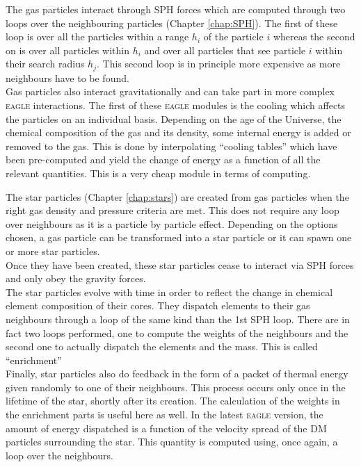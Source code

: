 \documentclass[a4paper,10pt]{report}
\newcommand{\eagle}{\textsc{eagle }}
\begin{document}
The gas particles interact through SPH forces which are computed through two loops over the neighbouring particles
(Chapter \ref{chap:SPH}). The first of these loop is over all the particles within a range $h_i$ of the particle $i$
whereas the second on is over all particles within $h_i$ and over all particles that see particle $i$ within their
search radius $h_j$. This second loop is in principle more expensive as more neighbours have to be found. \\
Gas particles also interact gravitationally and can take part in more complex \eagle interactions. The first of these
\eagle modules is the cooling  which affects the particles on an individual basis. Depending on the age of the
Universe, the chemical composition of the gas and its density, some internal energy is added or removed to the gas.
This is done by interpolating ``cooling tables'' which have been pre-computed and yield the change of energy as a
function of all the relevant quantities. This is a very cheap module in terms of computing.

The star particles (Chapter \ref{chap:stars}) are created from gas particles when the right gas density and pressure
criteria are met. This does not require any loop over neighbours as it is a particle by particle effect. Depending on
the options chosen, a gas particle can be transformed into a star particle or it can spawn one or more star particles.\\
Once they have been created, these star particles cease to interact via SPH forces and only obey the gravity forces. \\
The star particles evolve with time in order to reflect the change in chemical element composition of their cores.
They dispatch elements to their gas neighbours through a loop of the same kind than the 1st SPH loop. There are in fact
two loops performed, one to compute the weights of the neighbours and the second one to actually dispatch the elements
and the mass. This is called ``enrichment''\\
Finally, star particles also do feedback in the form of a packet of thermal energy given randomly to one of their
neighbours. This process occurs only once in the lifetime of the star, shortly after its creation. The calculation of
the weights in the enrichment parts is useful here as well. In the latest \eagle version, the amount of energy
dispatched is a function of the velocity spread of the DM particles surrounding the star. This quantity is computed
using, once again, a loop over the neighbours. \\
\end{document}
